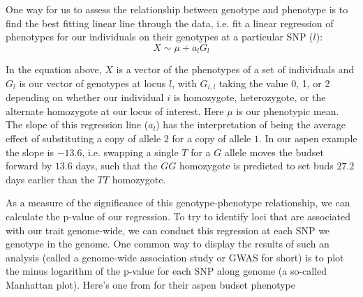 One way for us to assess the relationship between
genotype and phenotype is to find the best fitting linear line through the data, i.e. fit a linear regression of
phenotypes for our individuals on their genotypes at a particular SNP ($l$):
\begin{equation}
X \sim \mu + a_l G_{l}
\end{equation}

In the equation above, $X$ is a vector of the phenotypes of a set of individuals and $G_{l}$ is our vector of genotypes at locus $l$, with $G_{i,l}$ taking the value 0, 1, or 2 depending on whether our individual $i$ is homozygote, heterozygote, or the alternate homozygote at our locus of interest. Here $\mu$ is our phenotypic mean. The slope of this regression line ($a_l$) 
has the interpretation of being the average
effect of substituting a copy of allele $2$ for a copy of allele
$1$. In our aspen example the slope is $-13.6$, i.e. swapping a single $T$ for a $G$ allele
moves the budset forward by $13.6$ days, such that the $GG$ homozygote
is predicted to set buds $27.2$ days earlier than the $TT$ homozygote.   


As a measure of the significance of this genotype-phenotype relationship, we can
calculate the p-value of our regression. To try to identify loci
that are associated with our trait genome-wide, we can conduct this
regression at each SNP we genotype in the genome. One common way to display the
results of such an analysis (called a genome-wide association study or
GWAS for short) is to plot the minus logarithm of the p-value for each SNP along
genome (a so-called Manhattan plot). Here's one from 
\citet{wang:18} for their aspen budset phenotype

